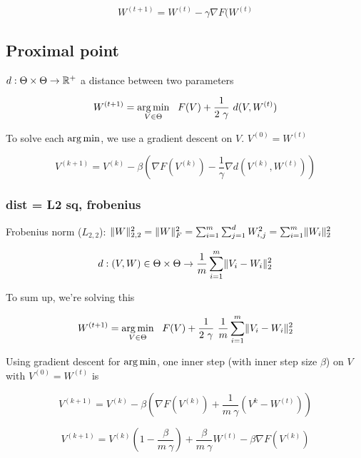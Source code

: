 \begin{equation}
	W^{(t+1)} = W^{(t)} - \gamma \nabla F(W^{(t)}
\end{equation}

\subsection{Proximal point}

$d: \Theta \times \Theta \rightarrow \mathbb{R}^+$ a distance between two parameters

\begin{equation}
	W^{(t+1)} = \argmin_{V \in \Theta} \ \  F(V) + \frac{1}{2 ~ \gamma} ~ d(V, W^{(t)})
\end{equation}

To solve each $\operatorname*{arg\,min}$, we use a gradient descent on $V$. $V^{(0)} = W^{(t)}$

\begin{equation}
	V^{(k+1)} = V^{(k)} - \beta \left(\nabla F(V^{(k)}) - \frac{1}{\gamma} \nabla d(V^{(k)}, W^{(t)})\right)
\end{equation}

\subsubsection{dist = L2 sq, frobenius}

Frobenius norm ($L_{2,2}$): $\lVert W\rVert_{2,2}^2 = \lVert W\rVert_F^2 = \sum_{i=1}^{m} \sum_{j=1}^{d} W_{i, j}^2 = \sum_{i=1}^{m} \lVert W_i\rVert_2^2$

\begin{equation}
	d : (V, W) \in \Theta \times \Theta \rightarrow \frac{1}{m} \sum_{i=1}^{m} \lVert V_i - W_i\rVert^2_2
\end{equation}

To sum up, we're solving this 

\begin{equation}
	W^{(t+1)} = \argmin_{V \in \Theta} \ \  F(V) + \frac{1}{2 ~ \gamma} ~ \frac{1}{m} \sum_{i=1}^{m} \norm{V_i - W_i}^2_2
\end{equation}

Using gradient descent for $\operatorname*{arg\,min}$, one inner step (with inner step size $\beta$) on $V$ with $V^{(0)} = W^{(t)}$ is

\begin{equation}
	V^{(k+1)} = V^{(k)} - \beta \left(\nabla F(V^{(k)}) + \frac{1}{m ~ \gamma} (V^{k} - W^{(t)}) \right) 
\end{equation}

\begin{equation}
	V^{(k+1)} = V^{(k)}\left(1 - \frac{\beta}{m ~ \gamma}\right) + \frac{\beta}{m ~ \gamma} W^{(t)}   - \beta \nabla F(V^{(k)})
\end{equation}

